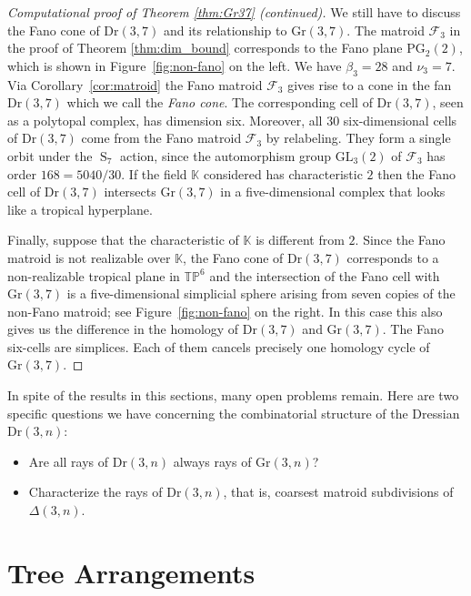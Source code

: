 \documentclass[12pt,a4paper]{amsart}
\theoremstyle{definition}
\newcommand{\K}{{\mathbb{K}}}
\newcommand{\PG}{{\mathrm{PG}}}
\newcommand{\GL}{{\mathrm{GL}}}
\newcommand{\Gr}{{\mathrm{Gr}}}
\newcommand{\Dr}{{\mathrm{Dr}}}
\newcommand{\TP}{{\mathbb{TP}}}
\providecommand\cF{{\mathscr{F}}}
\providecommand{\Sym}{\operatorname{S}}
\begin{document}
\begin{proof}[Computational proof of Theorem \ref{thm:Gr37} (continued)]
  We still have to discuss the Fano cone of $\Dr(3,7)$ and its
  relationship to $\Gr(3,7)$.  The matroid $\cF_3$ in the proof of
  Theorem \ref{thm:dim_bound} corresponds to the Fano plane $\PG_2(2)$,
  which is
  shown in Figure~\ref{fig:non-fano} on the left. We have $\beta_3=28$
  and $\nu_3=7$.  Via Corollary~\ref{cor:matroid} the Fano matroid
  $\cF_3$ gives rise to a cone in the fan $\Dr(3,7)$ which we call the
  \emph{Fano cone}.  The corresponding cell of $\Dr(3,7)$, seen as a
  polytopal complex, has dimension six.  Moreover, all $30$
  six-dimensional cells of $\Dr(3,7)$ come from the Fano matroid
  $\cF_3$ by relabeling. They form a single orbit under the $\Sym_7$
  action, since the automorphism group $\GL_3(2)$ of $\cF_3$ has order
  $168=5040/30$.  If the field $\K$ considered has characteristic $2$
  then the Fano cell of $\Dr(3,7)$ intersects $\Gr(3,7)$ in a
  five-dimensional complex that looks like a tropical hyperplane.

  Finally, suppose that the characteristic of $\K$ is different from
  $2$. Since the Fano matroid is not realizable over $\K$, the Fano cone
  of $\Dr(3,7)$ corresponds to a non-realizable tropical plane in $\TP^6$
  and the intersection of the Fano cell with $\Gr(3,7)$ is a
  five-dimensional simplicial sphere arising from seven copies of the
  non-Fano matroid; see Figure~\ref{fig:non-fano} on the right.  In
  this case this also gives us the difference in the homology of
  $\Dr(3,7)$ and $\Gr(3,7)$.  The Fano six-cells are simplices.
 Each of them cancels precisely one homology cycle of $\Gr(3,7)$. 
\end{proof}

In spite of the results in this sections, many open problems remain.
Here are two specific questions we have concerning the combinatorial
structure of the Dressian $\Dr(3,n)$:

\begin{itemize}
\item Are all rays of $\Dr(3,n)$ always rays of $\Gr(3,n)$?
\item Characterize the rays of $\Dr(3,n)$, that is, coarsest matroid
  subdivisions of $\Delta(3,n)$.
\end{itemize}

\section{Tree Arrangements}\label{sec:trees}
\end{document}
